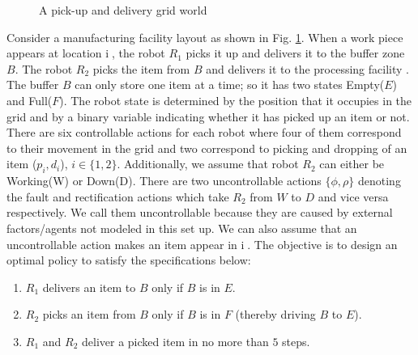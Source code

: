 \documentclass[letterpaper, 10 pt, conference]{ieeeconf}
\begin{document}
\begin{figure}[htbp]
    \centering
    \caption{A pick-up and delivery grid world}
    \label{fig:my_label1}
\end{figure}
Consider a manufacturing facility layout as shown in Fig. \ref{fig:my_label1}. When a work piece appears at location \textcircled{i}, the robot $R_1$ picks it up and delivers it to the buffer zone $B$. The robot $R_2$ picks the item from $B$ and delivers it to the processing facility . The buffer $B$ can only store one item at a time; so it has two states Empty($E$) and Full($F$). The robot state is determined by the position that it occupies in the grid and by a binary variable indicating whether it has picked up an item or not. There are six controllable actions for each robot where four of them correspond to their movement in the grid and two correspond to picking and dropping of an item ($p_i, d_i$), $i \in \{1, 2\}$. Additionally, we assume that robot $R_2$ can either be Working(W) or Down(D). There are two uncontrollable actions $\{\phi, \rho\}$ denoting the fault and rectification actions which take $R_2$ from $W$ to $D$ and vice versa respectively. We call them uncontrollable because they are caused by external factors/agents not modeled in this set up. We can also assume that an uncontrollable action makes an item appear in \textcircled{i}. The objective is to design an optimal policy to satisfy the specifications below:
\begin{enumerate}
    \item \label{w} $R_1$ delivers an item to $B$ only if $B$ is in $E$.
    \item $R_2$ picks an item from $B$ only if $B$ is in $F$ (thereby driving $B$ to $E$).
    \item \label{x} $R_1$ and $R_2$ deliver a picked item in no more than $5$ steps.
\end{enumerate}
\end{document}
